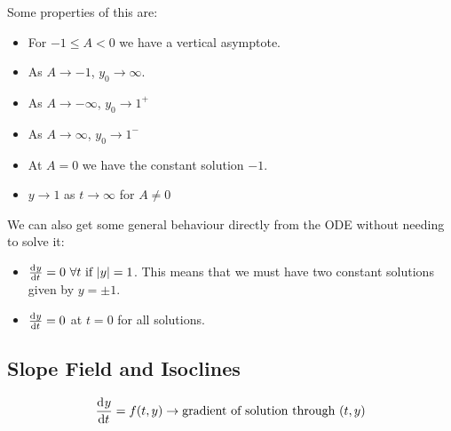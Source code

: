 \documentclass[../main.tex]{subfiles}
\begin{document}
\begin{example}
\begin{center}
  \end{center}
  Some properties of this are:
  \begin{itemize}
    \item For $-1 \leq A < 0$ we have a vertical asymptote.
    \item As $A \to -1$, $y_0 \to \infty$.
    \item As $A \to - \infty$, $y_0 \to 1^{+}$
    \item As $A \to \infty$, $y_0 \to 1^{-}$
    \item At $A = 0$ we have the constant solution $-1$.
    \item $y \to 1$ as $t \to \infty$ for $A \neq 0$
  \end{itemize}

  We can also get some general behaviour directly from the ODE without needing to solve it:
  \begin{itemize}
    \item $\deriv{y}{t} = 0\ \forall t \text{ if } |y| = 1$.
      This means that we must have two constant solutions given by $y = \pm 1$.
    \item $\deriv{y}{t} = 0$ at $t = 0$ for all solutions.
  \end{itemize}
\end{example}
\subsection{Slope Field and Isoclines}
\[
  \deriv{y}{t} = f(t, y) \rightarrow \text{gradient of solution through }(t, y)
\]
\end{document}

